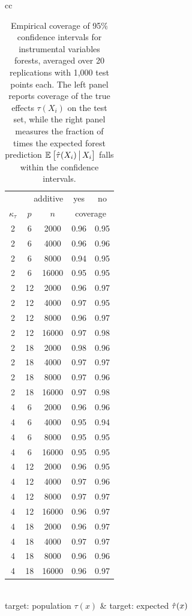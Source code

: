 \documentclass[aos]{imsart}
\theoremstyle{plain}
\theoremstyle{definition}
\theoremstyle{remark}
\begin{document}
\begin{CJK}{UTF8}{gbsn}
{\begin{appendix}
\begin{table}[t]
\begin{tabular}{cc}
\begin{tabular}{|ccc|cc|}
\hline
\multicolumn{3}{|r|}{additive} & yes & no \\
$\kappa_\tau$ & $p$ & $n$ & \multicolumn{2}{c|}{coverage} \\ 
  \hline
\hline
2 & 6 & 2000 & 0.96 & 0.95 \\ 
  2 & 6 & 4000 & 0.96 & 0.96 \\ 
  2 & 6 & 8000 & 0.94 & 0.95 \\ 
  2 & 6 & 16000 & 0.95 & 0.95 \\ 
   \hline
2 & 12 & 2000 & 0.96 & 0.97 \\ 
  2 & 12 & 4000 & 0.97 & 0.95 \\ 
  2 & 12 & 8000 & 0.96 & 0.97 \\ 
  2 & 12 & 16000 & 0.97 & 0.98 \\ 
   \hline
2 & 18 & 2000 & 0.98 & 0.96 \\ 
  2 & 18 & 4000 & 0.97 & 0.97 \\ 
  2 & 18 & 8000 & 0.97 & 0.96 \\ 
  2 & 18 & 16000 & 0.97 & 0.98 \\ 
   \hline
\hline
4 & 6 & 2000 & 0.96 & 0.96 \\ 
  4 & 6 & 4000 & 0.95 & 0.94 \\ 
  4 & 6 & 8000 & 0.95 & 0.95 \\ 
  4 & 6 & 16000 & 0.95 & 0.95 \\ 
   \hline
4 & 12 & 2000 & 0.96 & 0.95 \\ 
  4 & 12 & 4000 & 0.97 & 0.96 \\ 
  4 & 12 & 8000 & 0.97 & 0.97 \\ 
  4 & 12 & 16000 & 0.96 & 0.97 \\ 
   \hline
4 & 18 & 2000 & 0.96 & 0.97 \\ 
  4 & 18 & 4000 & 0.97 & 0.97 \\ 
  4 & 18 & 8000 & 0.96 & 0.96 \\ 
  4 & 18 & 16000 & 0.96 & 0.97 \\ 
   \hline
\end{tabular} \\
target: population $\tau(x)$ & target: expected $\hat{\tau}(x)$
\end{tabular}
\caption{Empirical coverage of 95\% confidence intervals for instrumental variables forests,
averaged over 20 replications with 1,000 test points each.
The left panel reports coverage of the true effects $\tau(X_i)$ on the test set, while the right panel
measures the fraction of times the expected forest prediction $\mathbb{E}_{}\left[\hat{\tau}(X_i) \,\big|\, X_i\right]$ falls
within the confidence intervals.}
\label{tab:coverage}
\vspace{-1.5\baselineskip}
\end{table}


\end{appendix}}
\end{CJK}
\end{document}
